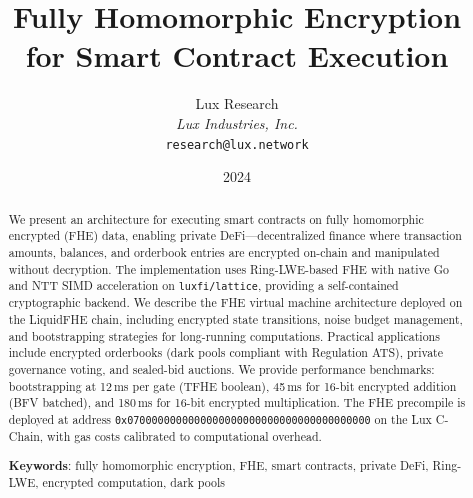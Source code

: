 \documentclass[11pt,a4paper]{article}
\title{\textbf{Fully Homomorphic Encryption\\for Smart Contract Execution}}
\author{
Lux Research \\
\textit{Lux Industries, Inc.}\\
\texttt{research@lux.network}
}
\date{2024}
\begin{document}
\luxcoverpage

\begin{abstract}
We present an architecture for executing smart contracts on fully homomorphic
encrypted (FHE) data, enabling private DeFi---decentralized finance where transaction
amounts, balances, and orderbook entries are encrypted on-chain and manipulated
without decryption. The implementation uses Ring-LWE-based FHE with native Go and
NTT SIMD acceleration on \texttt{luxfi/lattice}, providing a self-contained
cryptographic backend. We describe the FHE virtual machine architecture deployed
on the LiquidFHE chain, including encrypted state transitions, noise budget
management, and bootstrapping strategies for long-running computations. Practical
applications include encrypted orderbooks (dark pools compliant with Regulation ATS),
private governance voting, and sealed-bid auctions. We provide performance benchmarks:
bootstrapping at 12\,ms per gate (TFHE boolean), 45\,ms for 16-bit encrypted
addition (BFV batched), and 180\,ms for 16-bit encrypted multiplication. The FHE
precompile is deployed at address
\texttt{0x0700000000000000000000000000000000000000} on the Lux C-Chain, with gas
costs calibrated to computational overhead.

\textbf{Keywords}: fully homomorphic encryption, FHE, smart contracts, private DeFi,
Ring-LWE, encrypted computation, dark pools
\end{abstract}

\tableofcontents
\newpage












\end{document}
